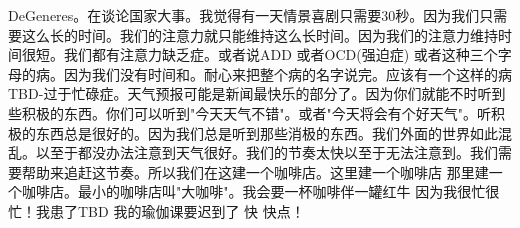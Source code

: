 DeGeneres。在谈论国家大事。我觉得有一天情景喜剧只需要30秒。因为我们只需要这么长的时间。我们的注意力就只能维持这么长时间。因为我们的注意力维持时间很短。我们都有注意力缺乏症。或者说ADD 或者OCD(强迫症) 或者这种三个字母的病。因为我们没有时间和。耐心来把整个病的名字说完。应该有一个这样的病 TBD-过于忙碌症。天气预报可能是新闻最快乐的部分了。因为你们就能不时听到些积极的东西。你们可以听到"今天天气不错"。或者"今天将会有个好天气"。听积极的东西总是很好的。因为我们总是听到那些消极的东西。我们外面的世界如此混乱。以至于都没办法注意到天气很好。我们的节奏太快以至于无法注意到。我们需要帮助来追赶这节奏。所以我们在这建一个咖啡店。这里建一个咖啡店 那里建一个咖啡店。最小的咖啡店叫"大咖啡"。我会要一杯咖啡伴一罐红牛 因为我很忙很忙！我患了TBD 我的瑜伽课要迟到了 快 快点！ 
%
